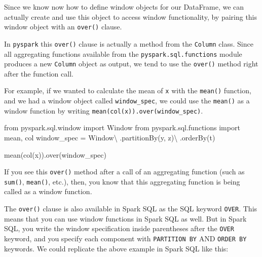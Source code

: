 \documentclass[
  11pt,
  letterpaper,
  DIV=11,
  numbers=noendperiod]{scrreprt}
\newenvironment{Shaded}{\begin{snugshade}}{\end{snugshade}}
\newcommand{\ImportTok}[1]{\textcolor[rgb]{0.00,0.46,0.62}{#1}}
\newcommand{\NormalTok}[1]{\textcolor[rgb]{0.00,0.23,0.31}{#1}}
\newcommand{\OperatorTok}[1]{\textcolor[rgb]{0.37,0.37,0.37}{#1}}
\newcommand{\StringTok}[1]{\textcolor[rgb]{0.13,0.47,0.30}{#1}}
\begin{document}
Since we know now how to define window objects for our DataFrame, we can
actually create and use this object to access window functionality, by
pairing this window object with an \texttt{over()} clause.

In \texttt{pyspark} this \texttt{over()} clause is actually a method
from the \texttt{Column} class. Since all aggregating functions
available from the \texttt{pyspark.sql.functions} module produces a new
\texttt{Column} object as output, we tend to use the \texttt{over()}
method right after the function call.

For example, if we wanted to calculate the mean of \texttt{x} with the
\texttt{mean()} function, and we had a window object called
\texttt{window\_spec}, we could use the \texttt{mean()} as a window
function by writing
\texttt{mean(col(\textquotesingle{}x\textquotesingle{})).over(window\_spec)}.

\begin{Shaded}
\begin{Highlighting}[]
\ImportTok{from}\NormalTok{ pyspark.sql.window }\ImportTok{import}\NormalTok{ Window}
\ImportTok{from}\NormalTok{ pyspark.sql.functions }\ImportTok{import}\NormalTok{ mean, col}
\NormalTok{window\_spec }\OperatorTok{=}\NormalTok{ Window}\OperatorTok{\textbackslash{}}
\NormalTok{    .partitionBy(}\StringTok{\textquotesingle{}y\textquotesingle{}}\NormalTok{, }\StringTok{\textquotesingle{}z\textquotesingle{}}\NormalTok{)}\OperatorTok{\textbackslash{}}
\NormalTok{    .orderBy(}\StringTok{\textquotesingle{}t\textquotesingle{}}\NormalTok{)}

\NormalTok{mean(col(}\StringTok{\textquotesingle{}x\textquotesingle{}}\NormalTok{)).over(window\_spec)}
\end{Highlighting}
\end{Shaded}

If you see this \texttt{over()} method after a call of an aggregating
function (such as \texttt{sum()}, \texttt{mean()}, etc.), then, you know
that this aggregating function is being called as a window function.

The \texttt{over()} clause is also available in Spark SQL as the SQL
keyword \texttt{OVER}. This means that you can use window functions in
Spark SQL as well. But in Spark SQL, you write the window specification
inside parentheses after the \texttt{OVER} keyword, and you specify each
component with \texttt{PARTITION\ BY} AND \texttt{ORDER\ BY} keywords.
We could replicate the above example in Spark SQL like this:
\end{document}
